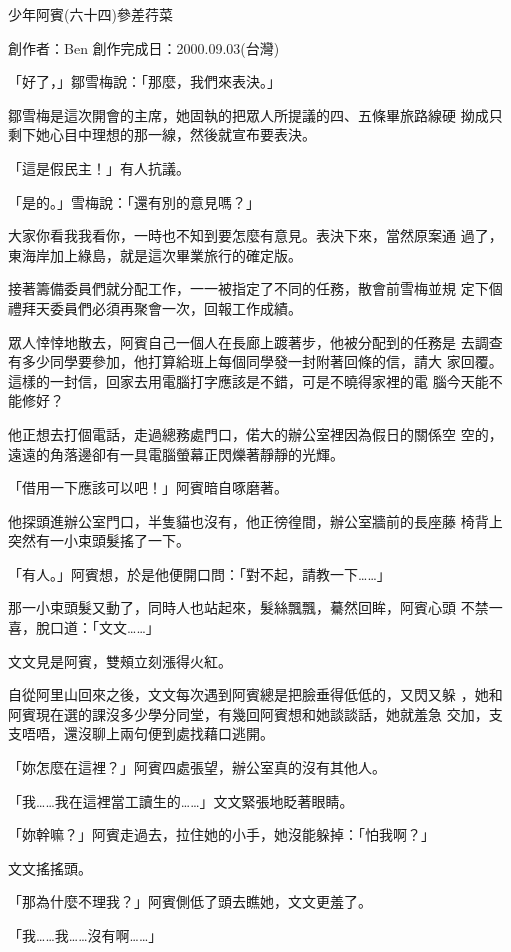 



少年阿賓(六十四)參差荇菜

創作者：Ben
創作完成日：2000.09.03(台灣)


「好了，」鄒雪梅說：「那麼，我們來表決。」

鄒雪梅是這次開會的主席，她固執的把眾人所提議的四、五條畢旅路線硬
拗成只剩下她心目中理想的那一線，然後就宣布要表決。

「這是假民主！」有人抗議。

「是的。」雪梅說：「還有別的意見嗎？」

大家你看我我看你，一時也不知到要怎麼有意見。表決下來，當然原案通
過了，東海岸加上綠島，就是這次畢業旅行的確定版。

接著籌備委員們就分配工作，一一被指定了不同的任務，散會前雪梅並規
定下個禮拜天委員們必須再聚會一次，回報工作成績。

眾人悻悻地散去，阿賓自己一個人在長廊上踱著步，他被分配到的任務是
去調查有多少同學要參加，他打算給班上每個同學發一封附著回條的信，請大
家回覆。這樣的一封信，回家去用電腦打字應該是不錯，可是不曉得家裡的電
腦今天能不能修好？

他正想去打個電話，走過總務處門口，偌大的辦公室裡因為假日的關係空
空的，遠遠的角落邊卻有一具電腦螢幕正閃爍著靜靜的光輝。

「借用一下應該可以吧！」阿賓暗自啄磨著。

他探頭進辦公室門口，半隻貓也沒有，他正徬徨間，辦公室牆前的長座藤
椅背上突然有一小束頭髮搖了一下。

「有人。」阿賓想，於是他便開口問：「對不起，請教一下……」

那一小束頭髮又動了，同時人也站起來，髮絲飄飄，驀然回眸，阿賓心頭
不禁一喜，脫口道：「文文……」

文文見是阿賓，雙頰立刻漲得火紅。

自從阿里山回來之後，文文每次遇到阿賓總是把臉垂得低低的，又閃又躲
，她和阿賓現在選的課沒多少學分同堂，有幾回阿賓想和她談談話，她就羞急
交加，支支唔唔，還沒聊上兩句便到處找藉口逃開。

「妳怎麼在這裡？」阿賓四處張望，辦公室真的沒有其他人。

「我……我在這裡當工讀生的……」文文緊張地眨著眼睛。

「妳幹嘛？」阿賓走過去，拉住她的小手，她沒能躲掉：「怕我啊？」

文文搖搖頭。

「那為什麼不理我？」阿賓側低了頭去瞧她，文文更羞了。

「我……我……沒有啊……」

